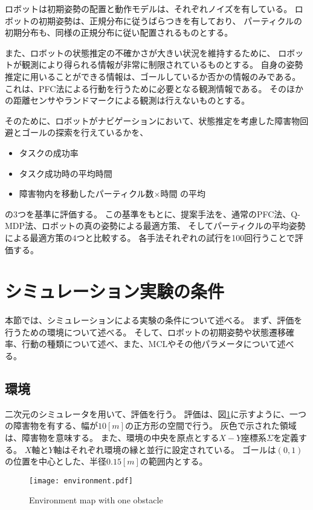 ロボットは初期姿勢の配置と動作モデルは、それぞれノイズを有している。
ロボットの初期姿勢は、正規分布に従うばらつきを有しており、
パーティクルの初期分布も、同様の正規分布に従い配置されるものとする。

また、ロボットの状態推定の不確かさが大きい状況を維持するために、
ロボットが観測により得られる情報が非常に制限されているものとする。
自身の姿勢推定に用いることができる情報は、ゴールしているか否かの情報のみである。
これは、PFC法による行動を行うために必要となる観測情報である。
そのほかの距離センサやランドマークによる観測は行えないものとする。

そのために、ロボットがナビゲーションにおいて、状態推定を考慮した障害物回避とゴールの探索を行えているかを、
\begin{itemize}
  \item タスクの成功率
  \item タスク成功時の平均時間
  \item 障害物内を移動したパーティクル数×時間 の平均
\end{itemize}
の3つを基準に評価する。
この基準をもとに、提案手法を、通常のPFC法、Q-MDP法、ロボットの真の姿勢による最適方策、
そしてパーティクルの平均姿勢による最適方策の4つと比較する。
各手法それぞれの試行を100回行うことで評価する。


\section{シミュレーション実験の条件} \label{section:実験条件}
本節では、シミュレーションによる実験の条件について述べる。
まず、評価を行うための環境について述べる。
そして、ロボットの初期姿勢や状態遷移確率、行動の種類について述べ、また、MCLやその他パラメータについて述べる。

\subsection{環境}
二次元のシミュレータを用いて、評価を行う。
評価は、図\ref{fig:environment}に示すように、一つの障害物を有する、幅が$10[\si{m}]$の正方形の空間で行う。
灰色で示された領域は、障害物を意味する。
また、環境の中央を原点とする$X-Y$座標系$\Sigma$を定義する。
$X$軸と$Y$軸はそれぞれ環境の縁と並行に設定されている。
ゴールは$(0, 1)$の位置を中心とした、半径$0.15[\si{m}]$の範囲内とする。
\begin{figure}[H]
  \begin{center}
    \texttt{[image: environment.pdf]}
    \caption{Environment map with one obstacle}
    \label{fig:environment}
  \end{center}
\end{figure}

